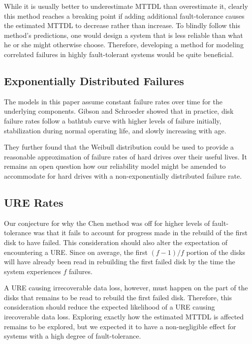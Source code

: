 \documentclass[XXX,endnotes]{usetex-v1}
\begin{document}
While it is usually better to underestimate MTTDL than overestimate it, clearly this method reaches a breaking point if adding additional fault-tolerance causes the estimated MTTDL to decrease rather than increase.  To blindly follow this method's predictions, one would design a system that is less reliable than what he or she might otherwise choose.  Therefore, developing a method for modeling correlated failures in highly fault-tolerant systems would be quite beneficial.

\subsection{Exponentially Distributed Failures}

The models in this paper assume constant failure rates over time for the underlying components.  Gibson and Schroeder showed that in practice, disk failure rates follow a bathtub curve\cite{weibull} with higher levels of failure initially, stabilization during normal operating life, and slowly increasing with age.

They further found that the Weibull distribution could be used to provide a reasonable approximation of failure rates of hard drives over their useful lives.  It remains an open question how our reliability model might be amended to accommodate for hard drives with a non-exponentially distributed failure rate.

\subsection{URE Rates}

Our conjecture for why the Chen method was off for higher levels of fault-tolerance was that it fails to account for progress made in the rebuild of the first disk to have failed.  This consideration should also alter the expectation of encountering a URE.  Since on average, the first $(f-1)/f$ portion of the disks will have already been read in rebuilding the first failed disk by the time the system experiences $f$ failures.

A URE causing irrecoverable data loss, however, must happen on the part of the disks that remains to be read to rebuild the first failed disk.  Therefore, this consideration should reduce the expected likelihood of a URE causing irecoverable data loss.  Exploring exactly how the estimated MTTDL is affected remains to be explored, but we expected it to have a non-negligible effect for systems with a high degree of fault-tolerance.
\end{document}
